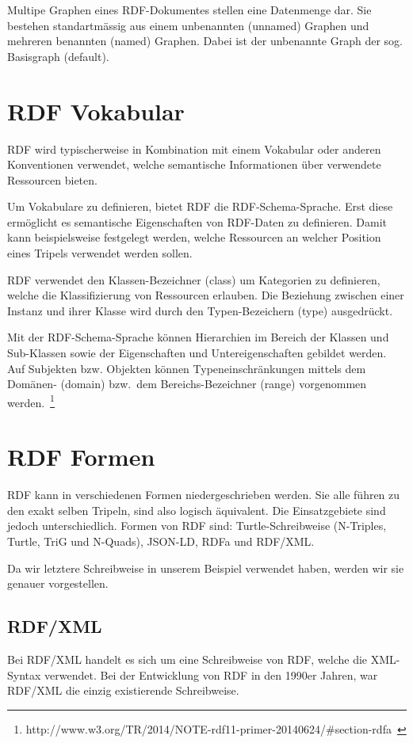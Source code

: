Multipe Graphen eines RDF-Dokumentes stellen eine Datenmenge dar. Sie bestehen standartmässig aus einem unbenannten (unnamed) Graphen und mehreren benannten (named) Graphen. Dabei ist der unbenannte Graph der sog. Basisgraph (default).

\section{RDF Vokabular}
\label{sec:rdf_rdf_voca}
RDF wird typischerweise in Kombination mit einem Vokabular oder anderen Konventionen verwendet, welche semantische Informationen über verwendete Ressourcen bieten.

Um Vokabulare zu definieren, bietet RDF die RDF-Schema-Sprache. Erst diese ermöglicht es semantische Eigenschaften von RDF-Daten zu definieren. Damit kann beispielsweise festgelegt werden, welche Ressourcen an welcher Position eines Tripels verwendet werden sollen.

RDF verwendet den Klassen-Bezeichner (class) um Kategorien zu definieren, welche die Klassifizierung von Ressourcen erlauben. Die Beziehung zwischen einer Instanz und ihrer Klasse wird durch den Typen-Bezeichern (type) ausgedrückt. 

Mit der RDF-Schema-Sprache können Hierarchien im Bereich der Klassen und Sub-Klassen sowie der Eigenschaften und Untereigenschaften gebildet werden. Auf Subjekten bzw. Objekten können Typeneinschränkungen mittels dem Domänen- (domain) bzw.\ dem Bereichs-Bezeichner (range) vorgenommen werden.~\footnote{http://www.w3.org/TR/2014/NOTE-rdf11-primer-20140624/\#section-rdfa~\cite{w3rdf}}

\section{RDF Formen}
\label{sec:rdf_rdf_formen}
RDF kann in verschiedenen Formen niedergeschrieben werden. Sie alle führen zu den exakt selben Tripeln, sind also logisch äquivalent. Die Einsatzgebiete sind jedoch unterschiedlich.
Formen von RDF sind: Turtle-Schreibweise (N-Triples, Turtle, TriG und N-Quads), JSON-LD, RDFa und RDF/XML.\@

Da wir letztere Schreibweise in unserem Beispiel verwendet haben, werden wir sie genauer vorgestellen.

\subsection{RDF/XML}
\label{sec:rdf_rdf_formen_xmlRdf}
Bei RDF/XML handelt es sich um eine Schreibweise von RDF, welche die XML-Syntax verwendet. Bei der Entwicklung von RDF in den 1990er Jahren, war RDF/XML die einzig existierende Schreibweise.

